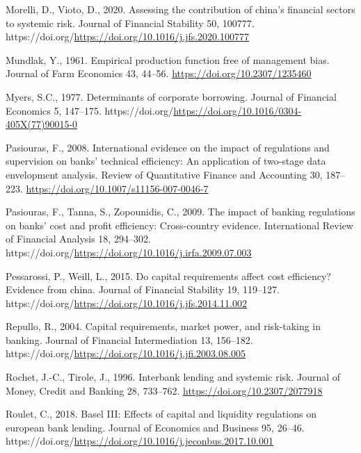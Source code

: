\documentclass[
  12pt,
  a4paper,
]{scrreprt}
\newlength{\cslhangindent}
\newenvironment{CSLReferences}[2] %
 {\begin{list}{}{%
  \setlength{\itemindent}{0pt}
  \setlength{\leftmargin}{0pt}
  \setlength{\parsep}{0pt}
  \ifodd #1
   \setlength{\leftmargin}{\cslhangindent}
   \setlength{\itemindent}{-1\cslhangindent}
  \fi
  \setlength{\itemsep}{#2\baselineskip}}}
 {\end{list}}
\begin{document}
\begin{CSLReferences}{1}{0}
Morelli, D., Vioto, D., 2020. Assessing the contribution of china's
financial sectors to systemic risk. Journal of Financial Stability 50,
100777. https://doi.org/\url{https://doi.org/10.1016/j.jfs.2020.100777}

Mundlak, Y., 1961. Empirical production function free of management
bias. Journal of Farm Economics 43, 44--56.
\url{https://doi.org/10.2307/1235460}

Myers, S.C., 1977. Determinants of corporate borrowing. Journal of
Financial Economics 5, 147--175.
https://doi.org/\url{https://doi.org/10.1016/0304-405X(77)90015-0}

Pasiouras, F., 2008. International evidence on the impact of regulations
and supervision on banks' technical efficiency: An application of
two-stage data envelopment analysis. Review of Quantitative Finance and
Accounting 30, 187--223. \url{https://doi.org/10.1007/s11156-007-0046-7}

Pasiouras, F., Tanna, S., Zopounidis, C., 2009. The impact of banking
regulations on banks' cost and profit efficiency: Cross-country
evidence. International Review of Financial Analysis 18, 294--302.
https://doi.org/\url{https://doi.org/10.1016/j.irfa.2009.07.003}

Pessarossi, P., Weill, L., 2015. Do capital requirements affect cost
efficiency? Evidence from china. Journal of Financial Stability 19,
119--127.
https://doi.org/\url{https://doi.org/10.1016/j.jfs.2014.11.002}

Repullo, R., 2004. Capital requirements, market power, and risk-taking
in banking. Journal of Financial Intermediation 13, 156--182.
https://doi.org/\url{https://doi.org/10.1016/j.jfi.2003.08.005}

Rochet, J.-C., Tirole, J., 1996. Interbank lending and systemic risk.
Journal of Money, Credit and Banking 28, 733--762.
\url{https://doi.org/10.2307/2077918}

Roulet, C., 2018. Basel III: Effects of capital and liquidity
regulations on european bank lending. Journal of Economics and Business
95, 26--46.
https://doi.org/\url{https://doi.org/10.1016/j.jeconbus.2017.10.001}


\end{CSLReferences}
\end{document}
